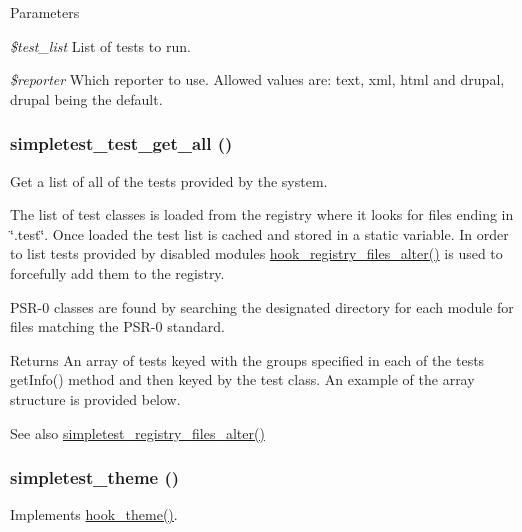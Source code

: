 \begin{DoxyParams}{Parameters}
\item[{\em \$test\_\-list}]List of tests to run. \item[{\em \$reporter}]Which reporter to use. Allowed values are: text, xml, html and drupal, drupal being the default. \end{DoxyParams}
\hypertarget{simpletest_8module_a2d7610898fc04f0e9fa9a750d98f1513}{
\subsubsection[{simpletest\_\-test\_\-get\_\-all}]{\setlength{\rightskip}{0pt plus 5cm}simpletest\_\-test\_\-get\_\-all ()}}
\label{simpletest_8module_a2d7610898fc04f0e9fa9a750d98f1513}
Get a list of all of the tests provided by the system.

The list of test classes is loaded from the registry where it looks for files ending in \char`\"{}.test\char`\"{}. Once loaded the test list is cached and stored in a static variable. In order to list tests provided by disabled modules \hyperlink{group__hooks_ga5b1201bb1afca26333900cd9aca6a2de}{hook\_\-registry\_\-files\_\-alter()} is used to forcefully add them to the registry.

PSR-\/0 classes are found by searching the designated directory for each module for files matching the PSR-\/0 standard.

\begin{DoxyReturn}{Returns}
An array of tests keyed with the groups specified in each of the tests getInfo() method and then keyed by the test class. An example of the array structure is provided below.
\end{DoxyReturn}

 \begin{DoxySeeAlso}{See also}
\hyperlink{simpletest_8module_a00dcdad5c7cce6aba550dfd1e24f6eec}{simpletest\_\-registry\_\-files\_\-alter()} 
\end{DoxySeeAlso}
\hypertarget{simpletest_8module_aec0b80be4d54147c75de4ff179ce435f}{
\subsubsection[{simpletest\_\-theme}]{\setlength{\rightskip}{0pt plus 5cm}simpletest\_\-theme ()}}
\label{simpletest_8module_aec0b80be4d54147c75de4ff179ce435f}
Implements \hyperlink{group__hooks_ga013ccb45c7aaab1c16cf9691428c910d}{hook\_\-theme()}. 